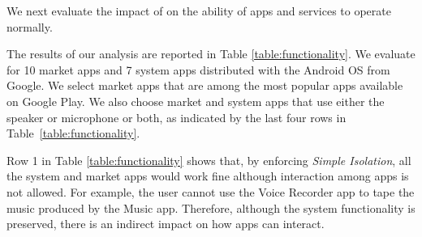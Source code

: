 We next evaluate the impact of \system on the ability of apps and services to operate normally. 
\begin{comment}
We start by considering the the effect of enforcing  {\em Simple Isolation} among processes accessing the microphone and speaker. We proceed by considering the impact on using \system to enforce MLS. We then analyze the effectiveness of user approval on accesses to the microphone. Finally, we evaluate the utility of two different resolvers to address audio flow errors that would prevent some of the market and system apps from working correctly.
\end{comment}
The results of our analysis are reported in Table \ref{table:functionality}.  We evaluate \system for 10 market apps and 7 system apps distributed with the Android OS from Google. We select market apps that are among the most popular apps available on Google Play.  We also choose market and system apps that use either the speaker or microphone or both, as indicated by the last four rows in Table~\ref{table:functionality}.  


\begin{comment}
In the last four columns, we report if the app needs an approval from the user before accessing the microphone, if the user is notified by the microphone icon and notification light, and whether the app makes use of the microphone and speaker. This last information is obtained systematically by analyzing the app code and checking for the \texttt{RECORD\_AUDIO} permission in the \texttt{AndroidManifest.xml} file. By default, all apps access the speaker.
\end{comment}

Row 1 in Table \ref{table:functionality} shows that, by enforcing {\em Simple Isolation}, all the system and market apps would work fine although interaction among apps is not allowed. For example, the user cannot use the Voice Recorder app to tape the music produced by the Music app. Therefore, although the system functionality is preserved, there is an indirect impact on how apps can interact. 

